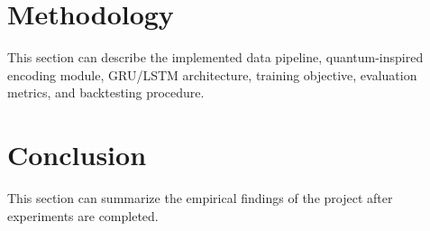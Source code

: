\documentclass[conference]{IEEEtran}
\begin{document}
\section{Methodology}
This section can describe the implemented data pipeline, quantum-inspired encoding module, GRU/LSTM architecture, training objective, evaluation metrics, and backtesting procedure.

\section{Conclusion}
This section can summarize the empirical findings of the project after experiments are completed.



\end{document}
